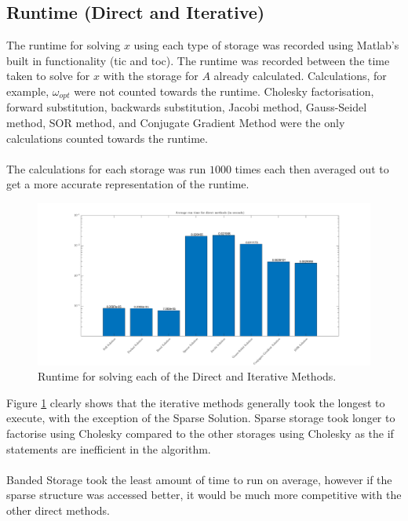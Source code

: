 \documentclass[12pt,a4paper]{article}
\begin{document}
\subsection{Runtime (Direct and Iterative)}
The runtime for solving $x$ using each type of storage was recorded using Matlab's built in functionality (tic and toc). The runtime was recorded between the time taken to solve for $x$ with the storage for $A$ already calculated. Calculations, for example, $\omega_{opt}$ were not counted towards the runtime. Cholesky factorisation, forward substitution, backwards substitution, Jacobi method, Gauss-Seidel method, SOR method, and Conjugate Gradient Method were the only calculations counted towards the runtime.
\\\\
The calculations for each storage was run $1000$ times each then averaged out to get a more accurate representation of the runtime.
\begin{figure}[H]
	\includegraphics[width=\linewidth]{images/RuntimeGraph.png}
	\caption{Runtime for solving each of the Direct and Iterative Methods.}
	\label{fig:runtime}
\end{figure}
Figure \ref{fig:runtime} clearly shows that the iterative methods generally took the longest to execute, with the exception of the Sparse Solution. Sparse storage took longer to factorise using Cholesky compared to the other storages using Cholesky as the if statements are inefficient in the algorithm.
\\\\
Banded Storage took the least amount of time to run on average, however if the sparse structure was accessed better, it would be much more competitive with the other direct methods.
\end{document}
